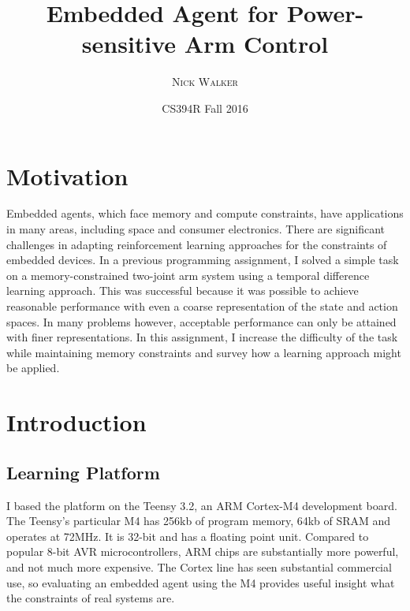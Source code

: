 \documentclass{article}
\title{Embedded Agent for Power-sensitive Arm Control} %
\author{\textsc{Nick Walker}} %
\date{CS394R Fall 2016} %
\begin{document}
	
\maketitle %



\section{Motivation}

Embedded agents, which face memory and compute constraints, have applications in many areas, including space and consumer electronics. There are significant challenges in adapting reinforcement learning approaches for the constraints of embedded devices. In a previous programming assignment, I solved a simple task on a memory-constrained two-joint arm system using a temporal difference learning approach. This was successful because it was possible to achieve reasonable performance with even a coarse representation of the state and action spaces. In many problems however, acceptable performance can only be attained with finer representations. In this assignment, I increase the difficulty of the task while maintaining memory constraints and survey how a learning approach might be applied.



\section{Introduction}

\subsection{Learning Platform}

I based the platform on the Teensy 3.2, an ARM Cortex-M4 development board. The Teensy's particular M4 has 256kb of program memory, 64kb of SRAM and operates at 72MHz. It is 32-bit and has a floating point unit. Compared to popular 8-bit AVR microcontrollers, ARM chips are substantially more powerful, and not much more expensive. The Cortex line has seen substantial commercial use, so evaluating an embedded agent using the M4 provides useful insight what the constraints of real systems are.
\end{document}
